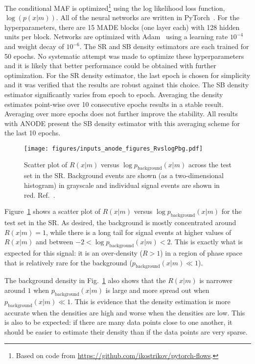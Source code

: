 \documentclass[a4paper,11pt]{article}
\begin{document}
The conditional MAF is optimized\footnote{Based on code from \url{https://github.com/ikostrikov/pytorch-flows}.} using the log likelihood loss function, $\log(p(x|m))$.  All of the neural networks are written in PyTorch~\cite{NEURIPS2019_9015}.  For the hyperparameters, there are 15 MADE blocks (one layer each) with 128 hidden units per block.  Networks are optimized with Adam~\cite{adam} using a learning rate $10^{-4}$ and weight decay of $10^{-6}$.  The SR and SB density estimators are each trained for 50 epochs. No systematic attempt was made to optimize these hyperparameters and it is likely that better performance could be obtained with further optimization. For the SR density estimator, the last epoch is chosen for simplicity and it was verified that the results are robust against this choice.  The SB density estimator significantly varies from epoch to epoch.  Averaging the density estimates point-wise over 10 consecutive epochs results in a stable result.  Averaging over more epochs does not further improve the stability.  All results with ANODE present the SB density estimator with this averaging scheme for the last 10 epochs.

\begin{figure}[h!]
\centering
\texttt{[image: figures/inputs\_anode\_figures\_RvslogPbg.pdf]}
\caption{Scatter plot of $R(x|m)$ versus $\log p_\text{background}(x|m)$ across the test set in the SR.  Background events are shown (as a two-dimensional histogram) in grayscale and individual signal events are shown in red.  Ref.~\cite{Nachman:2020lpy}.}
\label{fig:RvslogPbg}
\end{figure}

Figure~\ref{fig:RvslogPbg} shows a scatter plot of $R(x|m)$ versus $\log p_\text{background}(x|m)$ for the test set in the SR.  As desired, the background is mostly concentrated around $R(x|m)=1$, while there is a long tail for signal events at higher values of $R(x|m)$ and between $-2<\log p_\text{background}(x|m) <2$.   This is exactly what is expected for this signal: it is an over-density ($R>1$) in a region of phase space that is relatively rare for the background ($p_\text{background}(x|m)\ll 1$).

The background density in Fig.~\ref{fig:RvslogPbg} also shows that the $R(x|m)$ is narrower around $1$ when $p_\text{background}(x|m)$ is large and more spread out when $p_\text{background}(x|m)\ll 1$.    This is evidence that the density estimation is more accurate when the densities are high and worse when the densities are low. This is also to be expected: if there are many data points close to one another, it should be easier to estimate their density than if the data points are very sparse. 
\end{document}
